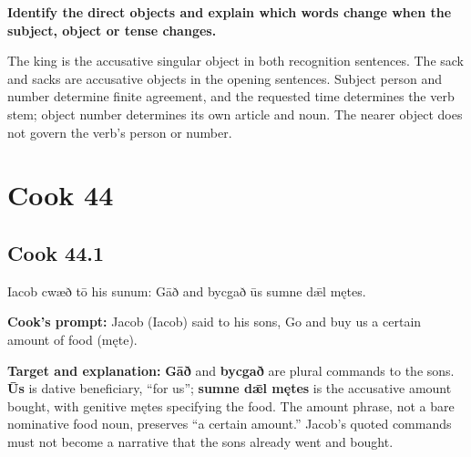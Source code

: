 \textbf{Identify the direct objects and explain which words change when the subject, object or tense changes.}

The king is the accusative singular object in both recognition sentences. The sack and sacks are accusative objects in the opening sentences. Subject person and number determine finite agreement, and the requested time determines the verb stem; object number determines its own article and noun. The nearer object does not govern the verb’s person or number.

\clearpage
\section*{Cook 44}

\par\begin{minipage}{\linewidth}\raggedright
\subsection*{Cook 44.1}

Iacob cwæð tō his sunum: Gāð and bycgað ūs sumne dǣl mętes.

\textbf{Cook’s prompt:} Jacob (Iacob) said to his sons, Go and buy us a certain amount of food (męte).

\textbf{Target and explanation:} \textbf{Gāð} and \textbf{bycgað} are plural commands to the sons. \textbf{Ūs} is dative beneficiary, “for us”; \textbf{sumne dǣl mętes} is the accusative amount bought, with genitive mętes specifying the food. The amount phrase, not a bare nominative food noun, preserves “a certain amount.” Jacob’s quoted commands must not become a narrative that the sons already went and bought.

\end{minipage}\par\addvspace{4pt}

